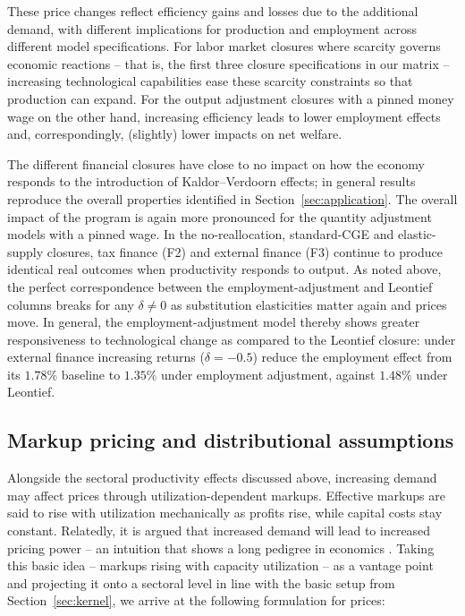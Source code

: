 These price changes reflect efficiency gains and losses due to the additional demand, with different implications for production and employment across different model specifications. For labor market closures where scarcity governs economic reactions -- that is, the first three closure specifications in our matrix -- increasing technological capabilities ease these scarcity constraints so that production can expand. For the output adjustment closures with a pinned money wage on the other hand,  increasing efficiency leads to lower employment effects and, correspondingly, (slightly) lower impacts on net welfare.

The different financial closures have close to no impact on how the economy responds to the introduction of Kaldor--Verdoorn effects; in general results reproduce the overall properties identified in Section~\ref{sec:application}. The overall impact of the program is again more pronounced for the quantity adjustment models with a pinned wage. In the no-reallocation, standard-CGE and elastic-supply closures, tax finance (F2) and external finance (F3) continue to produce identical real outcomes when productivity responds to output. As noted above, the perfect correspondence between the employment-adjustment and Leontief columns breaks for any $\delta \neq 0$ as substitution elasticities matter again and prices move. In general, the employment-adjustment model thereby shows greater responsiveness to technological change as compared to the Leontief closure: under external finance increasing returns ($\delta = -0.5$) reduce the employment effect from its $1.78\%$ baseline to $1.35\%$ under employment adjustment, against $1.48\%$ under Leontief. 



\subsection{Markup pricing and distributional assumptions}\label{subsec:pricing-markup}

Alongside the sectoral productivity effects discussed above, increasing demand may affect prices through utilization-dependent markups. Effective markups are said to rise with utilization mechanically as profits rise, while capital costs stay constant. Relatedly, it is argued that increased demand will lead to increased pricing power -- an intuition that shows a long pedigree in economics \citep{Kalecki1954,Bils1987}. Taking this basic idea -- markups rising with capacity utilization -- as a vantage point and projecting it onto a sectoral level in line with the basic setup from Section~\ref{sec:kernel}, we arrive at the following formulation for prices:

